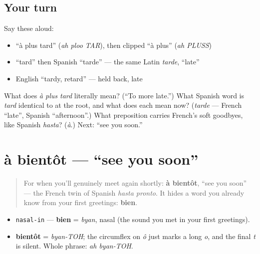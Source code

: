 \subsection*{Your turn}
Say these aloud:

\begin{itemize}
\raggedright
  \item \textquotedblleft{}à plus tard\textquotedblright{} (\emph{ah ploo TAR}), then clipped \textquotedblleft{}à plus\textquotedblright{} (\emph{ah PLUSS})
  \item \textquotedblleft{}tard\textquotedblright{} then Spanish \textquotedblleft{}tarde\textquotedblright{} — the same Latin \emph{tarde}, \textquotedblleft{}late\textquotedblright{}
  \item English \textquotedblleft{}tardy, retard\textquotedblright{} — held back, late
\end{itemize}

\begin{tcolorbox}[breakable,colback=teal!4,colframe=teal!35!black,title={Before you move on}]
What does \emph{à plus tard} literally mean? (\textquotedblleft{}To more late.\textquotedblright{}) What Spanish word is \emph{tard} identical to at the root, and what does each mean now? (\emph{tarde} — French \textquotedblleft{}late\textquotedblright{}, Spanish \textquotedblleft{}afternoon\textquotedblright{}.) What preposition carries French's soft goodbyes, like Spanish \emph{hasta}? (\emph{à}.) Next: \textquotedblleft{}see you soon.\textquotedblright{}
\end{tcolorbox}
\section[à bientôt]{à bientôt — \textquotedblleft{}see you soon\textquotedblright{}}

\label{lesson:FR-C04-a-bientot}



\begin{quote}
For when you'll genuinely meet again shortly: \textbf{à bientôt}, \textquotedblleft{}see you soon\textquotedblright{} — the French twin of Spanish \emph{hasta pronto}. It hides a word you already know from your first greetings: \textbf{bien}.
\end{quote}

\begin{sounds}
\begin{itemize}
\raggedright
  \item \texttt{nasal-in} — \textbf{bien} = \emph{byan}, nasal (the sound you met in your first greetings).
  \item \textbf{bientôt} = \emph{byan-TOH}; the circumflex on \emph{ô} just marks a long \emph{o}, and the final \emph{t} is silent. Whole phrase: \emph{ah byan-TOH}.
\end{itemize}
\end{sounds}

